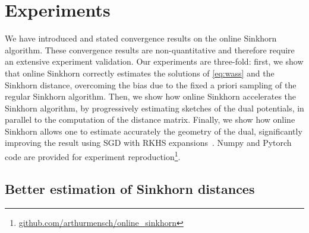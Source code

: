\section{Experiments}\label{sec:exps}

We have introduced and stated convergence results on the online Sinkhorn
algorithm. These convergence results are non-quantitative and therefore require
an extensive experiment validation. Our experiments are three-fold: first, we
show that online Sinkhorn correctly estimates the solutions of
\eqref{eq:wass} and the Sinkhorn distance, overcoming the bias due to the fixed
a priori sampling of the regular Sinkhorn algorithm. Then, we show how online
Sinkhorn accelerates the Sinkhorn algorithm, by progressively estimating
sketches of the dual potentials, in parallel to the computation of the distance
matrix. Finally, we show how online Sinkhorn allows one to estimate accurately
the geometry of the dual, significantly improving the result using SGD with RKHS
expansions~\citep{2016-genevay-nips}. Numpy and Pytorch code are provided for experiment reproduction\footnote{\url{github.com/arthurmensch/online_sinkhorn}}.

\subsection{Better estimation of Sinkhorn distances}\label{sec:exp1}





